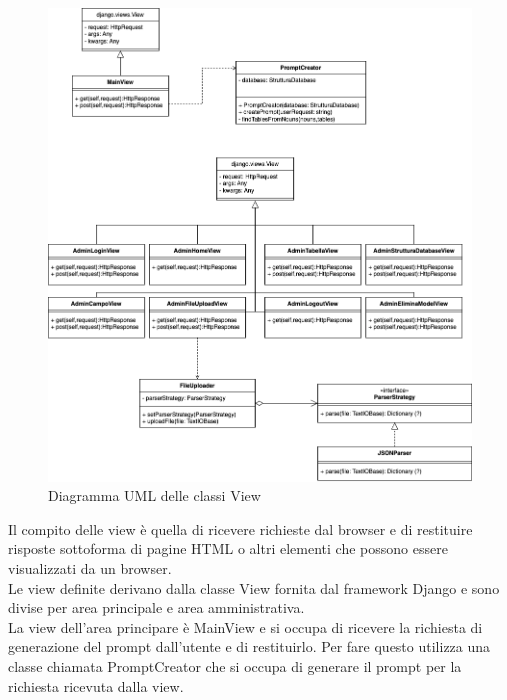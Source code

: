 \documentclass[5pt]{article}
\begin{document}
	\begin{figure}[H]
		\includegraphics[scale=0.55]{UML_classes/views.png}
		\caption{Diagramma UML delle classi View}
		\centering
	\end{figure}

	
	Il compito delle view è quella di ricevere richieste dal browser e di restituire risposte sottoforma di pagine HTML o altri elementi che possono essere visualizzati da un browser.\\
	
	Le view definite derivano dalla classe View fornita dal framework Django e sono divise per area principale e area amministrativa.\\
	
	La view dell'area principare è MainView e si occupa di ricevere la richiesta di generazione del prompt dall'utente e di restituirlo.
	Per fare questo utilizza una classe chiamata PromptCreator che si occupa di generare il prompt per la richiesta ricevuta dalla view.\\
	
\end{document}
